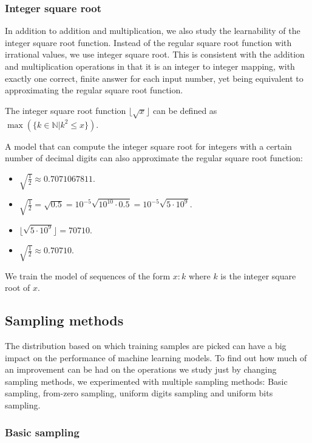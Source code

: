 \subsubsection{Integer square root}
\label{methods:ops:isqrt}

In addition to addition and multiplication, we also study the learnability of the integer square root function. Instead of the regular square root function with irrational values, we use integer square root. This is consistent with the addition and multiplication operations in that it is an integer to integer mapping, with exactly one correct, finite answer for each input number, yet being equivalent to approximating the regular square root function.

The integer square root function $\lfloor \sqrt{x} \rfloor$ can be defined as $\max(\{ k \in \mathbb{N} | k^2 \leq x \})$.

A model that can compute the integer square root for integers with a certain number of decimal digits can also approximate the regular square root function:

\begin{itemize}
	\item $\sqrt{\frac{1}{2}} \approx 0.7071067811$.
	\item $\sqrt{\frac{1}{2}} = \sqrt{0.5} = 10^{-5} \sqrt{10^{10} \cdot 0.5}
	= 10^{-5} \sqrt{5 \cdot 10^9}$.
	\item $\lfloor \sqrt{5 \cdot 10^9} \rfloor = 70710$.
	\item $\sqrt{\frac{1}{2}} \approx 0.70710$.
\end{itemize}

We train the model of sequences of the form $x: k$ where $k$ is the integer square root of $x$.


\subsection{Sampling methods}
\label{methods:sampling}

The distribution based on which training samples are picked can have a big impact on the performance of machine learning models. To find out how much of an improvement can be had on the operations we study just by changing sampling methods, we experimented with multiple sampling methods: Basic sampling, from-zero sampling, uniform digits sampling and uniform bits sampling.

\subsubsection{Basic sampling}
\label{methods:sampling:basic}

